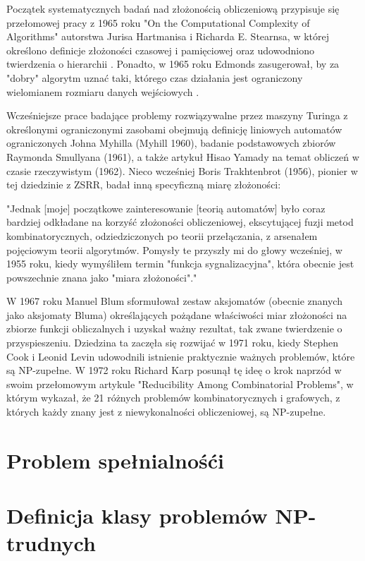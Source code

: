 Początek systematycznych badań nad złożonością obliczeniową przypisuje się przełomowej pracy z 1965 roku "On the Computational Complexity of Algorithms" autorstwa Jurisa Hartmanisa i Richarda E. Stearnsa, w której określono definicje złożoności czasowej i pamięciowej oraz udowodniono twierdzenia o hierarchii \cite{FortnowH03}. Ponadto, w 1965 roku Edmonds zasugerował, by za "dobry" algorytm uznać taki, którego czas działania jest ograniczony wielomianem rozmiaru danych wejściowych \cite{Karp86}.

Wcześniejsze prace badające problemy rozwiązywalne przez maszyny Turinga z określonymi ograniczonymi zasobami obejmują \cite{FortnowH03} definicję liniowych automatów ograniczonych Johna Myhilla (Myhill 1960), badanie podstawowych zbiorów Raymonda Smullyana (1961), a także artykuł Hisao Yamady \cite{Yamada62a} na temat obliczeń w czasie rzeczywistym (1962). Nieco wcześniej Boris Trakhtenbrot (1956), pionier w tej dziedzinie z ZSRR, badał inną specyficzną miarę złożoności:

"Jednak [moje] początkowe zainteresowanie [teorią automatów] było coraz bardziej odkładane na korzyść złożoności obliczeniowej, ekscytującej fuzji metod kombinatorycznych, odziedziczonych po teorii przełączania, z arsenałem pojęciowym teorii algorytmów. Pomysły te przyszły mi do głowy wcześniej, w 1955 roku, kiedy wymyśliłem termin "funkcja sygnalizacyjna", która obecnie jest powszechnie znana jako "miara złożoności"\cite{Trakhtenbrot08}."

W 1967 roku Manuel Blum sformułował zestaw aksjomatów (obecnie znanych jako aksjomaty Bluma) określających pożądane właściwości miar złożoności na zbiorze funkcji obliczalnych i uzyskał ważny rezultat, tak zwane twierdzenie o przyspieszeniu. Dziedzina ta zaczęła się rozwijać w 1971 roku, kiedy Stephen Cook i Leonid Levin udowodnili istnienie praktycznie ważnych problemów, które są NP-zupełne. W 1972 roku Richard Karp posunął tę ideę o krok naprzód w swoim przełomowym artykule "Reducibility Among Combinatorial Problems", w którym wykazał, że 21 różnych problemów kombinatorycznych i grafowych, z których każdy znany jest z niewykonalności obliczeniowej, są NP-zupełne.


\section{Problem spełnialnośći}

\section{Definicja klasy problemów NP-trudnych}



